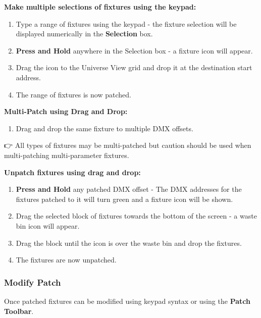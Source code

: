 \documentclass[
]{article}
\providecommand{\tightlist}{%
  \setlength{\itemsep}{0pt}\setlength{\parskip}{0pt}}
\begin{document}
\textbf{Make multiple selections of fixtures using the keypad:}

\begin{enumerate}
\def\labelenumi{\arabic{enumi}.}
\item
  Type a range of fixtures using the keypad - the fixture selection will be displayed numerically in the \textbf{Selection} box.
\item
  \textbf{Press and Hold} anywhere in the Selection box - a fixture icon will appear.
\item
  Drag the icon to the Universe View grid and drop it at the destination start address.
\item
  The range of fixtures is now patched.
\end{enumerate}

\textbf{Multi-Patch using Drag and Drop:}

\begin{enumerate}
\def\labelenumi{\arabic{enumi}.}
\tightlist
\item
  Drag and drop the same fixture to multiple DMX offsets.
\end{enumerate}

👉 All types of fixtures may be multi-patched but caution should be used when multi-patching multi-parameter fixtures.

\textbf{Unpatch fixtures using drag and drop:}

\begin{enumerate}
\def\labelenumi{\arabic{enumi}.}
\item
  \textbf{Press and Hold} any patched DMX offset - The DMX addresses for the fixtures patched to it will turn green and a fixture icon will be shown.
\item
  Drag the selected block of fixtures towards the bottom of the screen - a waste bin icon will appear.
\item
  Drag the block until the icon is over the waste bin and drop the fixtures.
\item
  The fixtures are now unpatched.
\end{enumerate}

\hypertarget{modify-patch}{%
\subsubsection{Modify Patch}\label{modify-patch}}

Once patched fixtures can be modified using keypad syntax or using the \textbf{Patch Toolbar}.
\end{document}
